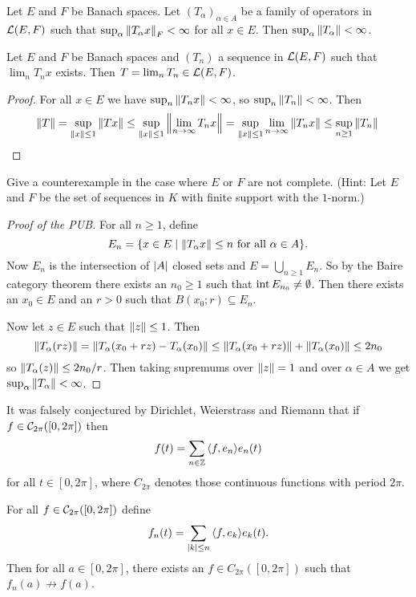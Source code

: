 \begin{thm}
	Let $E$ and $F$ be Banach spaces.
	Let $(T_\alpha)_{\alpha \in A}$ be a family of operators in $\mathcal{L}(E,F)$ such that $\sup_\alpha \left\lVert T_\alpha x \right\rVert_F<\infty$ for all $x \in E$.
	Then $\sup_\alpha \left\lVert T_\alpha \right\rVert<\infty$.
\end{thm}

\begin{cor}
	Let $E$ and $F$ be Banach spaces and $(T_n)$ a sequence in $\mathcal{L}(E,F)$ such that $\lim_n T_nx$ exists.
	Then $T=\lim_n T_n \in \mathcal{L}(E,F)$.
\end{cor}

\begin{proof}
	For all $x \in E$ we have $\sup_n \left\lVert T_nx \right\rVert<\infty$, so $\sup_n\left\lVert T_n \right\rVert<\infty$.
	Then
	\[\left\lVert T \right\rVert = \sup_{\left\lVert x \right\rVert\leq 1} \left\lVert Tx \right\rVert \leq \sup_{\left\lVert x \right\rVert\leq 1} \left\lVert \lim_{n \to \infty} T_nx \right\rVert = \sup_{\left\lVert x \right\rVert\leq 1}\lim_{n \to \infty} \left\lVert T_nx \right\rVert \leq \sup_{n \geq 1} \left\lVert T_n \right\rVert \qedhere\]
\end{proof}

\begin{exer}
	Give a counterexample in the case where $E$ or $F$ are not complete.
	(Hint: Let $E$ and $F$ be the set of sequences in $K$ with finite support with the $1$-norm.)
\end{exer}

\begin{proof}[Proof of the PUB]
	For all $n \geq 1$, define
	\[E_n=\{x \in E \mid \left\lVert T_\alpha x \right\rVert \leq n \text{ for all } \alpha \in A\}.\]
	Now $E_n$ is the intersection of $\left\lvert A \right\rvert$ closed sets and $E = \bigcup_{n \geq 1} E_n$.
	So by the Baire category theorem there exists an $n_0 \geq 1$ such that $\operatorname{int} E_{n_0} \neq \emptyset$.
	Then there exists an $x_0 \in E$ and an $r>0$ such that $B(x_0;r) \subseteq E_n$.
	
	Now let $z \in E$ such that $\left\lVert z \right\rVert \leq 1$.
	Then
	\[\left\lVert T_\alpha(rz) \right\rVert = \left\lVert T_\alpha(x_0+rz)-T_\alpha(x_0) \right\rVert \leq \left\lVert T_\alpha(x_0+rz) \right\rVert + \left\lVert T_\alpha(x_0) \right\rVert \leq 2n_0\]
	so $\left\lVert T_\alpha(z) \right\rVert \leq 2n_0/r$.
	Then taking supremums over $\left\lVert z \right\rVert=1$ and over $\alpha \in A$ we get $\sup_\alpha\left\lVert T_\alpha \right\rVert<\infty$.
\end{proof}

\begin{rmk}
	It was falsely conjectured by Dirichlet, Weierstrass and Riemann that if $f \in \mathcal{C}_{2\pi}([0,2\pi])$ then
	\[f(t) = \sum_{n \in \mathbb{Z}} {\left\langle f,e_n \right\rangle}e_n(t)\]
	for all $t \in [0,2\pi]$, where $C_{2\pi}$ denotes those continuous functions with period $2\pi$.
\end{rmk}

\begin{thm}
	For all $f \in \mathcal{C}_{2\pi}([0,2\pi])$ define
	\[f_n(t) = \sum_{\left\lvert k \right\rvert \leq n}{\left\langle f,e_k \right\rangle}e_k(t).\]
	Then for all $a \in [0,2\pi]$, there exists an $f \in C_{2\pi}([0,2\pi])$ such that $f_n(a) \not\to f(a)$.
\end{thm}